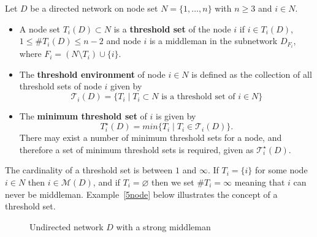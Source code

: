 \begin{definition} \label{Threshold Set}
Let $D$ be a directed network on node set $N=\{1, \ldots, n\}$ with $n \geqslant 3$ and $i \in N$.

\begin{itemize} 
\item A node set $T_{i}(D) \subset N$ is a \textbf{threshold set} of the node $i$ if $i \in T_{i}(D)$, $1 \leqslant \# T_{i}(D) \leqslant n-2$ and node $i$ is a middleman in the subnetwork $D_{F_i}$, where $F_{i} = ( N \setminus T_{i}) \cup \{i\}$.

\item The \textbf{threshold environment} of node $i \in N$ is defined as the collection of all threshold sets of node $i$ given by 
\begin{equation}
\mathcal{T}_{i}(D) = \{T_{i} \mid T_{i} \subset N \mbox{ is a threshold set of } i \in N\}
\end{equation}
\item The \textbf{minimum threshold set} of $i$ is given by 
\begin{equation}
T_{i}^{\star}(D) = min \{ T_{i} \mid T_{i} \in \mathcal{T}_{i}(D)\}.
\end{equation}
There may exist a number of minimum threshold sets for a node, and therefore a set of minimum threshold sets is required, given as $\mathcal{T}_{i}^{\star}(D)$.
\end{itemize}
\end{definition}

The cardinality of a threshold set is between $1$ and $\infty$. If $T_{i} = \{i\}$ for some node $i \in N$ then $i \in \mathcal{M}(D)$, and if $T_{i} = \varnothing$ then we set $\# T_{i} = \infty$ meaning that $i$ can never be middleman. Example~\ref{5node} below illustrates the concept of a threshold set.

\begin{figure}[t]
\begin{center}
\end{center}
\caption{Undirected network $D$ with a strong middleman}
\label{Fig:5node}
\end{figure}

